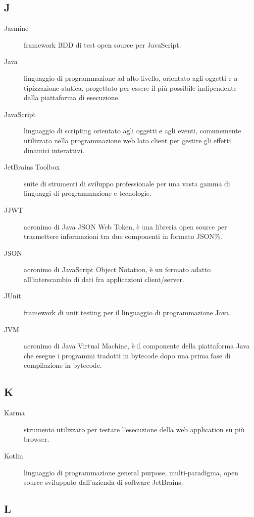 \documentclass[../manuale-manutentore.tex]{subfiles}
\begin{document}
\subsection{J}

\begin{description}
    \item[Jasmine] framework BDD di test open source per JavaScript.
    \item[Java] linguaggio di programmazione ad alto livello, orientato agli oggetti e a tipizzazione statica, progettato per essere il più possibile indipendente dalla piattaforma di esecuzione.
    \item[JavaScript] linguaggio di scripting orientato agli oggetti e agli eventi, comunemente utilizzato nella programmazione web lato client per gestire gli effetti dinamici interattivi.
    \item[JetBrains Toolbox] suite di strumenti di sviluppo professionale per una vasta gamma di linguaggi di programmazione e tecnologie.
    \item[JJWT] acronimo di Java JSON Web Token, è una libreria open source per trasmettere informazioni tra due componenti in formato JSON\%.
    \item[JSON] acronimo di JavaScript Object Notation, è un formato adatto all'interscambio di dati fra applicazioni client/server.
    \item[JUnit] framework di unit testing per il linguaggio di programmazione Java.
    \item[JVM] acronimo di Java Virtual Machine, è il componente della piattaforma Java che esegue i programmi tradotti in bytecode dopo una prima fase di compilazione in bytecode.
\end{description}

\subsection{K}

\begin{description}
    \item[Karma] strumento utilizzato per testare l'esecuzione della web application su più browser.
    \item[Kotlin] linguaggio di programmazione general purpose, multi-paradigma, open source sviluppato dall'azienda di software JetBrains.
\end{description}

\subsection{L}
\end{document}
